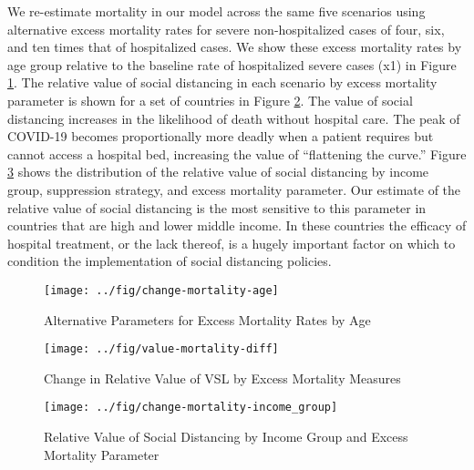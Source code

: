 \documentclass[11pt]{article}
\begin{document}
We re-estimate mortality in our model across the same five scenarios using alternative excess mortality rates for severe non-hospitalized cases of four, six, and ten times that of hospitalized cases. We show these excess mortality rates by age group relative to the baseline rate of hospitalized severe cases (x1) in Figure \ref{fig:change-mortality-age}. The relative value of social distancing in each scenario by excess mortality parameter is shown for a set of countries in Figure \ref{fig:value-mortality-diff}. The value of social distancing increases in the likelihood of death without hospital care. The peak of COVID-19 becomes proportionally more deadly when a patient requires but cannot access a hospital bed, increasing the value of ``flattening the curve.'' Figure \ref{fig:change-mortality-income_group} shows the distribution of the relative value of social distancing by income group, suppression strategy, and excess mortality parameter. Our estimate of the relative value of social distancing is the most sensitive to this parameter in countries that are high and lower middle income. In these countries the efficacy of hospital treatment, or the lack thereof, is a hugely important factor on which to condition the implementation of social distancing policies.



\begin{figure}[htbp!]
\centering
\caption{Alternative Parameters for Excess Mortality Rates by Age}
\texttt{[image: ../fig/change-mortality-age]}
\label{fig:change-mortality-age}
\end{figure}


\begin{figure}[htbp!]
\centering
\caption{Change in Relative Value of VSL by Excess Mortality Measures}
\texttt{[image: ../fig/value-mortality-diff]}
\label{fig:value-mortality-diff}
\end{figure}

\begin{figure}[htbp!]
\centering
\caption{Relative Value of Social Distancing by Income Group and Excess Mortality Parameter}
\texttt{[image: ../fig/change-mortality-income\_group]}
\label{fig:change-mortality-income_group}
\end{figure}



\clearpage
\begin{singlespacing}

\printbibliography

\end{singlespacing}
\end{document}
